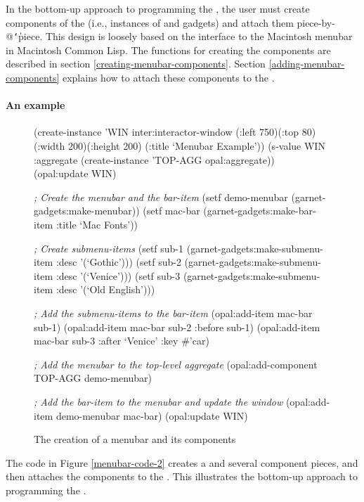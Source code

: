 In the bottom-up approach to programming the , the user must
create components of the  (i.e., instances of  and
 gadgets) and attach them piece-by-@{\tt\char`\|}piece.  This design is
loosely based on the interface to the Macintosh menubar in Macintosh Common
Lisp.  The functions
for creating the components are described in section
\ref{creating-menubar-components}.  Section
\ref{adding-menubar-components} explains how to attach these components to
the .


\paragraph{An example}

\begin{figure}
\begin{programexample}

(create-instance 'WIN inter:interactor-window
   (:left 750)(:top 80)(:width 200)(:height 200)
   (:title `Menubar Example'))
(s-value WIN :aggregate (create-instance 'TOP-AGG opal:aggregate))
(opal:update WIN)

{\it ; Create the menubar and the bar-item}
(setf demo-menubar (garnet-gadgets:make-menubar))
(setf mac-bar (garnet-gadgets:make-bar-item :title `Mac Fonts'))

{\it ; Create submenu-items}
(setf sub-1 (garnet-gadgets:make-submenu-item :desc '(`Gothic')))
(setf sub-2 (garnet-gadgets:make-submenu-item :desc '(`Venice')))
(setf sub-3 (garnet-gadgets:make-submenu-item :desc '(`Old English')))

{\it ; Add the submenu-items to the bar-item}
(opal:add-item mac-bar sub-1)
(opal:add-item mac-bar sub-2 :before sub-1)
(opal:add-item mac-bar sub-3 :after `Venice' :key \#'car)
	
{\it ; Add the menubar to the top-level aggregate}
(opal:add-component TOP-AGG demo-menubar)

{\it ; Add the bar-item to the menubar and update the window}
(opal:add-item demo-menubar mac-bar)
(opal:update WIN)

\end{programexample}
\caption{The creation of a menubar and its components}
\end{figure}

The code in Figure \ref{menubar-code-2} creates a  and several
component pieces, and then attaches the components to the .  This
illustrates the bottom-up approach to programming the .


